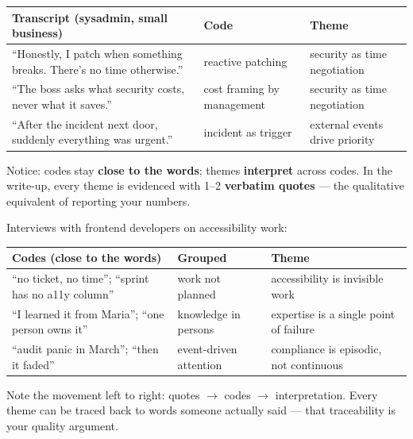 \documentclass[11pt,a4paper,british,twoside=false,headings=small,chapterprefix=false,numbers=noenddot]{scrbook}
\begin{document}
\begin{center}\small
\small
  \renewcommand{\arraystretch}{1.4}
  \begin{tabular}{@{}p{7.4cm}p{2.7cm}p{2.6cm}@{}}
    \toprule
    \textbf{Transcript (sysadmin, small business)} & \textbf{Code} & \textbf{Theme}\\
    \midrule
    ``Honestly, I patch when something breaks. There's no time otherwise.'' & reactive patching & security as time negotiation\\
    ``The boss asks what security costs, never what it saves.'' & cost framing by management & security as time negotiation\\
    ``After the incident next door, suddenly everything was urgent.'' & incident as trigger & external events drive priority\\
    \bottomrule
  \end{tabular}
  

  Notice: codes stay \textbf{close to the words}; themes \textbf{interpret}
  across codes. In the write-up, every theme is evidenced with 1--2
  \textbf{verbatim quotes} --- the qualitative equivalent of reporting your
  numbers.
\end{center}

\begin{center}\small
\small
  Interviews with frontend developers on accessibility work:
  
  \footnotesize
  \renewcommand{\arraystretch}{1.3}
  \begin{tabular}{@{}p{5.2cm}p{3.4cm}p{4.0cm}@{}}
    \toprule
    \textbf{Codes (close to the words)} & \textbf{Grouped} & \textbf{Theme}\\
    \midrule
    ``no ticket, no time''; ``sprint has no a11y column'' & work not planned & accessibility is invisible work\\
    ``I learned it from Maria''; ``one person owns it'' & knowledge in persons & expertise is a single point of failure\\
    ``audit panic in March''; ``then it faded'' & event-driven attention & compliance is episodic, not continuous\\
    \bottomrule
  \end{tabular}
  

  Note the movement left to right: quotes $\rightarrow$ codes $\rightarrow$
  interpretation. Every theme can be traced back to words someone actually
  said --- that traceability is your quality argument.
\end{center}
\end{document}
